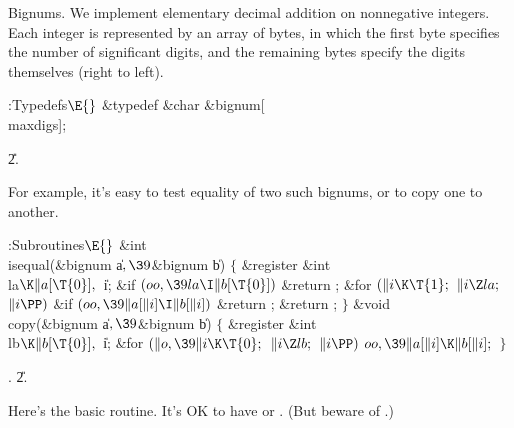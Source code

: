 Bignums. We implement elementary decimal
addition on nonnegative integers.
Each integer is represented by an array of bytes, in which the first
byte specifies the number of significant digits, and the remaining bytes
specify the digits themselves (right to left).

\Y\B\4:Typedefs\X${}\E{}$\6
\&{typedef} \&{char} \&{bignum}[\\{maxdigs}];\par
\U2.\fi

For example, it's easy to test equality of
two such bignums,
or to copy one to another.

\Y\B\4:Subroutines\X${}\E{}$\6
\&{int} \\{isequal}(\&{bignum} \|a${},\39{}$\&{bignum} \|b)\1\1\2\2\6
${}\{{}$\1\6
\&{register} \&{int} \\{la}${}\K\|a[\T{0}],{}$ \|i;\7
\&{if} ${}(\\{oo},\39\\{la}\I\|b[\T{0}]){}$\1\5
\&{return} ;\2\6
\&{for} ${}(\|i\K\T{1};{}$ ${}\|i\Z\\{la};{}$ ${}\|i\PP){}$\1\6
\&{if} ${}(\\{oo},\39\|a[\|i]\I\|b[\|i]){}$\1\5
\&{return} ;\2\2\6
\&{return} ;\6
\4${}\}{}$\2\7
\&{void} \\{copy}(\&{bignum} \|a${},\39{}$\&{bignum} \|b)\1\1\2\2\6
${}\{{}$\1\6
\&{register} \&{int} \\{lb}${}\K\|b[\T{0}],{}$ \|i;\7
\&{for} ${}(\|o,\39\|i\K\T{0};{}$ ${}\|i\Z\\{lb};{}$ ${}\|i\PP){}$\1\5
${}\\{oo},\39\|a[\|i]\K\|b[\|i];{}$\2\6
\4${}\}{}$\2\par
{}.
\U2.\fi

Here's the basic routine. It's OK to have %
 or .
(But beware of .)


